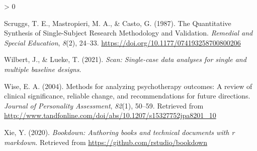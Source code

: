 \documentclass[
]{book}
\newlength{\cslhangindent}
\newenvironment{CSLReferences}[2] %
 {%
  \setlength{\parindent}{0pt}
  \ifodd #1 \everypar{\setlength{\hangindent}{\cslhangindent}}\ignorespaces\fi
  \ifnum #2 > 0
  \setlength{\parskip}{#2\baselineskip}
  \fi
 }%
 {}
\begin{document}
\begin{CSLReferences}{1}{0}
\leavevmode\hypertarget{ref-scruggs_quantitative_1987}{}%
Scruggs, T. E., Mastropieri, M. A., \& Casto, G. (1987). The {Quantitative} {Synthesis} of {Single}-{Subject} {Research} {Methodology} and {Validation}. \emph{Remedial and Special Education}, \emph{8}(2), 24--33. \url{https://doi.org/10.1177/074193258700800206}

\leavevmode\hypertarget{ref-R-scan}{}%
Wilbert, J., \& Lueke, T. (2021). \emph{Scan: Single-case data analyses for single and multiple baseline designs}.

\leavevmode\hypertarget{ref-wise_methods_2004}{}%
Wise, E. A. (2004). Methods for analyzing psychotherapy outcomes: {A} review of clinical significance, reliable change, and recommendations for future directions. \emph{Journal of Personality Assessment}, \emph{82}(1), 50--59. Retrieved from \url{http://www.tandfonline.com/doi/abs/10.1207/s15327752jpa8201_10}

\leavevmode\hypertarget{ref-R-bookdown}{}%
Xie, Y. (2020). \emph{Bookdown: Authoring books and technical documents with r markdown}. Retrieved from \url{https://github.com/rstudio/bookdown}

\end{CSLReferences}
\end{document}
